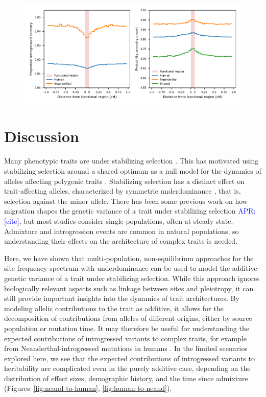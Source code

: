 \documentclass{article}
\newcommand{\aprcomment}[1]{{\textcolor{blue}{APR: #1}}}
\begin{document}
\begin{figure}[t!]
    \centering
    \includegraphics{../figures/introgression_deserts.SD_0.02.pdf}
    \caption{
        \textbf{}
    }
    \label{fig:deserts}
\end{figure}

\section*{Discussion}

Many phenotypic traits are under stabilizing selection
\citep{hodgins2015gene,sanjak2018evidence,sella2019thinking}. This has
motivated using stabilizing selection around a shared optimum as a null model
for the dynamics of alleles affecting polygenic traits
\citep{yair2022population}. Stabilizing selection has a distinct effect on
trait-affecting alleles, characterized by symmetric underdominance
\citep{robertson1956effect,keightley1988quantitative}, that is, selection
against the minor allele. There has been some previous work on how migration
shapes the genetic variance of a trait under stabilizing selection
\aprcomment{[cite]}, but most studies consider single populations, often at
steady state. Admixture and introgression events are common in natural
populations, so understanding their effects on the architecture of complex
traits is needed.

Here, we have shown that multi-population, non-equilibrium approaches for the
site frequency spectrum with underdominance can be used to model the additive
genetic variance of a trait under stabilizing selection. While this approach
ignores biologically relevant aspects such as linkage between sites and
pleiotropy, it can still provide important insights into the dynamics of trait
architectures. By modeling allelic contributions to the trait as additive, it
allows for the decomposition of contributions from alleles of different
origins, either by source population or mutation time. It may therefore be
useful for understanding the expected contributions of introgressed variants to
complex traits, for example from Neanderthal-introgressed mutations in humans
\citep{wei2023lingering}. In the limited scenarios explored here, we see that
the expected contributions of introgressed variants to heritability are
complicated even in the purely additive case, depending on the distribution of
effect sizes, demographic history, and the time since admixture
(Figures~\ref{fig:neand-to-human}, \ref{fig:human-to-neand}).
\end{document}
